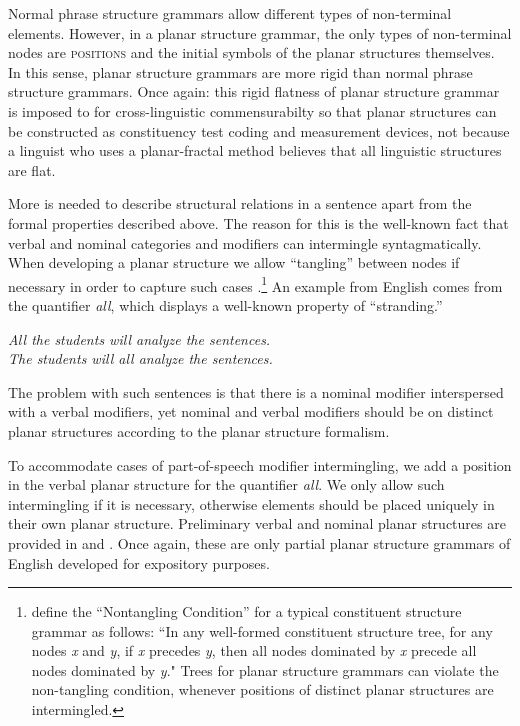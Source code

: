 \documentclass[output=paper,hidelinks]{langscibook}
\begin{document}
Normal phrase structure grammars allow different types of non-terminal elements. However, in a planar structure grammar, the only types of non-terminal nodes are \textsc{positions} and the initial symbols of the planar structures themselves. In this sense, planar structure grammars are more rigid than normal phrase structure grammars. Once again: this rigid flatness of planar structure grammar is imposed to for cross-linguistic commensurabilty so that planar structures can be constructed as constituency test coding and measurement devices, not because a linguist who uses a planar-fractal method believes that all linguistic structures are flat.

More is needed to describe structural relations in a sentence apart from the formal properties described above. The reason for this is the well-known fact that verbal and nominal categories and modifiers can intermingle syntagmatically. When developing a planar structure we allow ``tangling'' between nodes if necessary in order to capture such cases \citep[442]{partee1990mathematical}.\footnote{\citet[442]{partee1990mathematical} define the ``Nontangling Condition'' for a typical constituent structure grammar as follows: ``In any well-formed constituent structure tree, for any nodes \textit{x} and \textit{y}, if \textit{x} precedes \textit{y}, then all nodes dominated by \textit{x} precede all nodes dominated by \textit{y}." Trees for planar structure grammars can violate the non-tangling condition, whenever positions of distinct planar structures are intermingled.} An example from English comes from the quantifier \textit{all}, which displays a well-known property of ``stranding.''

\ea 
    \ea \textit{All the students will analyze the sentences.} \\
    \ex \textit{The students will all analyze the sentences.}
    \z 
\z 

The problem with such sentences is that there is a nominal modifier interspersed with a verbal modifiers, yet nominal and verbal modifiers should be on distinct planar structures according to the planar structure formalism. 

To accommodate cases of part-of-speech modifier intermingling, we add a position in the verbal planar structure for the quantifier \textit{all}. We only allow such intermingling if it is necessary, otherwise elements should be placed uniquely in their own planar structure. Preliminary verbal and nominal planar structures are provided in  and . Once again, these are only partial planar structure grammars of English developed for expository purposes.
\end{document}
